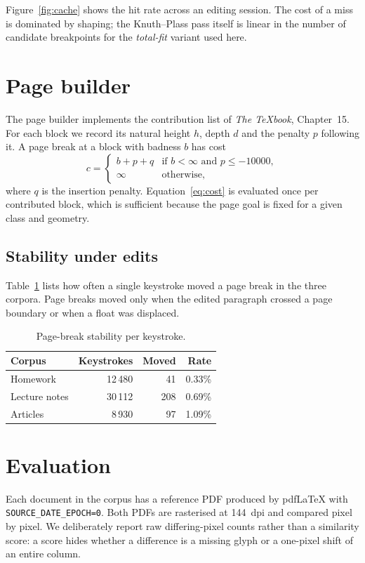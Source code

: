 \documentclass[10pt,twocolumn]{article}
\begin{document}
Figure~\ref{fig:cache} shows the hit rate across an editing session. The
cost of a miss is dominated by shaping; the Knuth--Plass pass itself is
linear in the number of candidate breakpoints for the \emph{total-fit}
variant used here.

\section{Page builder}\label{sec:pages}
The page builder implements the contribution list of \emph{The
\TeX book}, Chapter~15. For each block we record its natural height $h$,
depth $d$ and the penalty $p$ following it. A page break at a block with
badness $b$ has cost
\begin{equation}
  c = \begin{cases}
    b + p + q & \text{if } b < \infty \text{ and } p \le -10000,\\
    \infty & \text{otherwise},
  \end{cases}
  \label{eq:cost}
\end{equation}
where $q$ is the insertion penalty. Equation~\eqref{eq:cost} is evaluated
once per contributed block, which is sufficient because the page goal is
fixed for a given class and geometry.

\subsection{Stability under edits}
Table~\ref{tab:stability} lists how often a single keystroke moved a page
break in the three corpora. Page breaks moved only when the edited
paragraph crossed a page boundary or when a float was displaced.

\begin{table}[t]
  \centering
  \caption{Page-break stability per keystroke.}
  \label{tab:stability}
  \begin{tabular}{lrrr}
    \toprule
    Corpus & Keystrokes & Moved & Rate \\
    \midrule
    Homework      & 12\,480 & 41  & 0.33\% \\
    Lecture notes & 30\,112 & 208 & 0.69\% \\
    Articles      & 8\,930  & 97  & 1.09\% \\
    \bottomrule
  \end{tabular}
\end{table}

\section{Evaluation}\label{sec:eval}
Each document in the corpus has a reference PDF produced by pdfLaTeX with
\texttt{SOURCE\_DATE\_EPOCH=0}. Both PDFs are rasterised at 144~dpi and
compared pixel by pixel. We deliberately report raw differing-pixel counts
rather than a similarity score: a score hides whether a difference is a
missing glyph or a one-pixel shift of an entire column.
\end{document}
